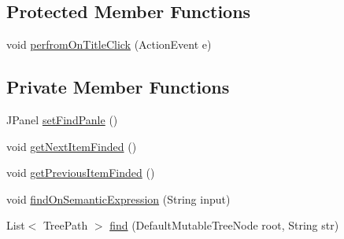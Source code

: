 \subsection*{Protected Member Functions}
\begin{DoxyCompactItemize}
\item 
void \hyperlink{classit_1_1emarolab_1_1cagg_1_1debugging_1_1baseComponents_1_1customPanel_1_1SemanticTreeGuiPanel_a34e9faabf147fe474d6d1682d3a46f34}{perfrom\-On\-Title\-Click} (Action\-Event e)
\end{DoxyCompactItemize}
\subsection*{Private Member Functions}
\begin{DoxyCompactItemize}
\item 
J\-Panel \hyperlink{classit_1_1emarolab_1_1cagg_1_1debugging_1_1baseComponents_1_1customPanel_1_1SemanticTreeGuiPanel_a6b3d93ac5854203045b0411fc607d16e}{set\-Find\-Panle} ()
\item 
void \hyperlink{classit_1_1emarolab_1_1cagg_1_1debugging_1_1baseComponents_1_1customPanel_1_1SemanticTreeGuiPanel_a23b552c4aeadc1a6637d7599d3049a92}{get\-Next\-Item\-Finded} ()
\item 
void \hyperlink{classit_1_1emarolab_1_1cagg_1_1debugging_1_1baseComponents_1_1customPanel_1_1SemanticTreeGuiPanel_a3fbe3fe75b9a7611c6e28c6cf304654d}{get\-Previous\-Item\-Finded} ()
\item 
void \hyperlink{classit_1_1emarolab_1_1cagg_1_1debugging_1_1baseComponents_1_1customPanel_1_1SemanticTreeGuiPanel_a95cef188d5e9c072bea4c86b0ef0e582}{find\-On\-Semantic\-Expression} (String input)
\item 
List$<$ Tree\-Path $>$ \hyperlink{classit_1_1emarolab_1_1cagg_1_1debugging_1_1baseComponents_1_1customPanel_1_1SemanticTreeGuiPanel_a7646e1bee4eaa3a39a4dd77a1c0e945d}{find} (Default\-Mutable\-Tree\-Node root, String str)
\end{DoxyCompactItemize}
